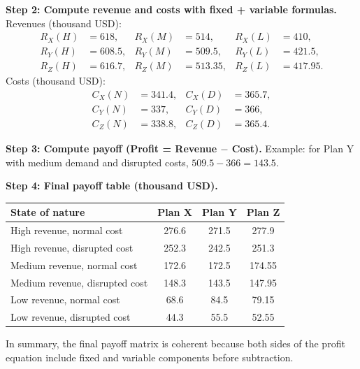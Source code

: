 \begin{ExamProblems}
		\textbf{Step 2: Compute revenue and costs with fixed + variable formulas.}
		Revenues (thousand USD):
		\[
		\begin{aligned}
		R_X(H)&=618, & R_X(M)&=514, & R_X(L)&=410,\\
		R_Y(H)&=608.5, & R_Y(M)&=509.5, & R_Y(L)&=421.5,\\
		R_Z(H)&=616.7, & R_Z(M)&=513.35, & R_Z(L)&=417.95.
		\end{aligned}
		\]
		Costs (thousand USD):
		\[
		\begin{aligned}
		C_X(N)&=341.4, & C_X(D)&=365.7,\\
		C_Y(N)&=337, & C_Y(D)&=366,\\
		C_Z(N)&=338.8, & C_Z(D)&=365.4.
		\end{aligned}
		\]
		
		\textbf{Step 3: Compute payoff (Profit = Revenue $-$ Cost).}
		Example: for Plan Y with medium demand and disrupted costs,
		\(509.5-366=143.5\).
		
		\textbf{Step 4: Final payoff table (thousand USD).}
		\begin{center}
			\begin{tabular}{l c c c}
				\toprule
				State of nature & Plan X & Plan Y & Plan Z \\
				\midrule
				High revenue, normal cost & 276.6 & 271.5 & 277.9 \\
				High revenue, disrupted cost & 252.3 & 242.5 & 251.3 \\
				Medium revenue, normal cost & 172.6 & 172.5 & 174.55 \\
				Medium revenue, disrupted cost & 148.3 & 143.5 & 147.95 \\
				Low revenue, normal cost & 68.6 & 84.5 & 79.15 \\
				Low revenue, disrupted cost & 44.3 & 55.5 & 52.55 \\
				\bottomrule
			\end{tabular}
		\end{center}
		
		In summary, the final payoff matrix is coherent because both sides of the profit equation include fixed and variable components before subtraction.
	\end{ExamProblems}

